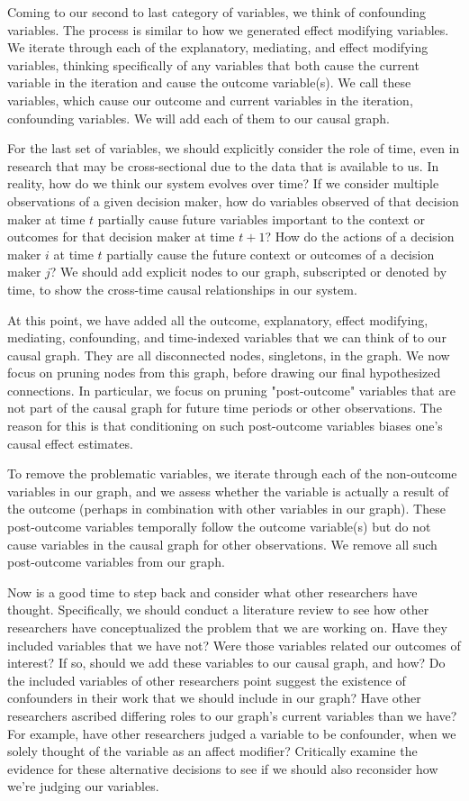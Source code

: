 Coming to our second to last category of variables, we think of confounding variables.
The process is similar to how we generated effect modifying variables.
We iterate through each of the explanatory, mediating, and effect modifying variables, thinking specifically of any variables that both cause the current variable in the iteration and cause the outcome variable(s).
We call these variables, which cause our outcome and current variables in the iteration, confounding variables.
We will add each of them to our causal graph.

For the last set of variables, we should explicitly consider the role of time, even in research that may be cross-sectional due to the data that is available to us.
In reality, how do we think our system evolves over time?
If we consider multiple observations of a given decision maker, how do variables observed of that decision maker at time $t$ partially cause future variables important to the context or outcomes for that decision maker at time $t+1$?
How do the actions of a decision maker $i$ at time $t$ partially cause the future context or outcomes of a decision maker $j$?
We should add explicit nodes to our graph, subscripted or denoted by time, to show the cross-time causal relationships in our system.

At this point, we have added all the outcome, explanatory, effect modifying, mediating, confounding, and time-indexed variables that we can think of to our causal graph.
They are all disconnected nodes, singletons, in the graph.
We now focus on pruning nodes from this graph, before drawing our final hypothesized connections.
In particular, we focus on pruning "post-outcome" variables that are not part of the causal graph for future time periods or other observations.
The reason for this is that conditioning on such post-outcome variables biases one's causal effect estimates.

To remove the problematic variables, we iterate through each of the non-outcome variables in our graph, and we assess whether the variable is actually a result of the outcome (perhaps in combination with other variables in our graph).
These post-outcome variables temporally follow the outcome variable(s) but do not cause variables in the causal graph for other observations.
We remove all such post-outcome variables from our graph.

Now is a good time to step back and consider what other researchers have thought.
Specifically, we should conduct a literature review to see how other researchers have conceptualized the problem that we are working on.
Have they included variables that we have not?
Were those variables related our outcomes of interest?
If so, should we add these variables to our causal graph, and how?
Do the included variables of other researchers point suggest the existence of confounders in their work that we should include in our graph?
Have other researchers ascribed differing roles to our graph's current variables than we have?
For example, have other researchers judged a variable to be confounder, when we solely thought of the variable as an affect modifier?
Critically examine the evidence for these alternative decisions to see if we should also reconsider how we're judging our variables.

